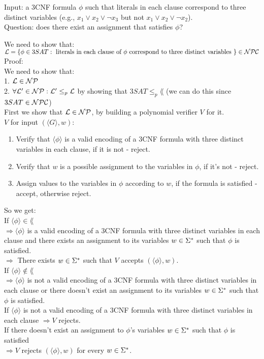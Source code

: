 Input: a 3CNF formula $\phi$ such that literals in each clause correspond
to three distinct variables (e.g., $x_1 \vee x_2 \vee \neg x_3$ but not $x_1 \vee x_2 \vee \neg x_2$). \\
Question: does there exist an assignment that satisfies $\phi$?

We need to show that: \\
$\mathcal{L} = \{\phi \in 3SAT: \text{ literals in each clause of $\phi$ correspond
        to three distinct variables }\} \in \mathcal{N}\mathcal{P}\mathcal{C}$ \\

Proof: \\
We need to show that: \\
1. $\mathcal{L} \in \mathcal{N}\mathcal{P}$ \\
2. $\forall \mathcal{L}' \in \mathcal{N}\mathcal{P}: \mathcal{L}' \leq_p \mathcal{L}$ by showing that $3SAT \leq_p \lang$ (we can do this since $3SAT \in \mathcal{N}\mathcal{P}\mathcal{C}$) \\

First we show that $\mathcal{L} \in \mathcal{N}\mathcal{P}$, by building a polynomial verifier $V$ for it. \\
$V$ for input $(\langle G \rangle, w)$:
\begin{enumerate}[1., itemsep=5pt]
    \item Verify that $\langle \phi \rangle$ is a valid encoding of a 3CNF formula with three distinct variables in each clause, if it is not - reject.

    \item Verify that $w$ is a possible assignment to the variables in $\phi$, if it's not - reject.

    \item Assign values to the variables in $\phi$ according to $w$, if the formula is satisfied - accept, otherwise reject.

\end{enumerate}

So we get: \\
If $\langle \phi \rangle \in \lang$ \\
$\Rightarrow \langle \phi \rangle$ is a valid encoding of a 3CNF formula with three distinct variables in each clause
and there exists an assignment to its variables $w \in \Sigma^*$ such that $\phi$ is satisfied. \\
$\Rightarrow $ There exists $w \in \Sigma^*$ such that $V$ accepts $(\langle \phi \rangle, w)$. \\

If $\langle \phi \rangle \notin \lang$ \\
$\Rightarrow \langle \phi \rangle$ is not a valid encoding of a 3CNF formula with three distinct variables in each clause
or there doesn't exist an assignment to its variables $w \in \Sigma^*$ such that $\phi$ is satisfied. \\
If $\langle \phi \rangle$ is not a valid encoding of a 3CNF formula with three distinct variables in each clause $\Rightarrow V$ rejects. \\
If there doesn't exist an assignment to $\phi$'s variables $w \in \Sigma^*$ such that $\phi$ is satisfied \\
$\Rightarrow V$ rejects $(\langle \phi \rangle, w)$ for every $w \in \Sigma^*$.

